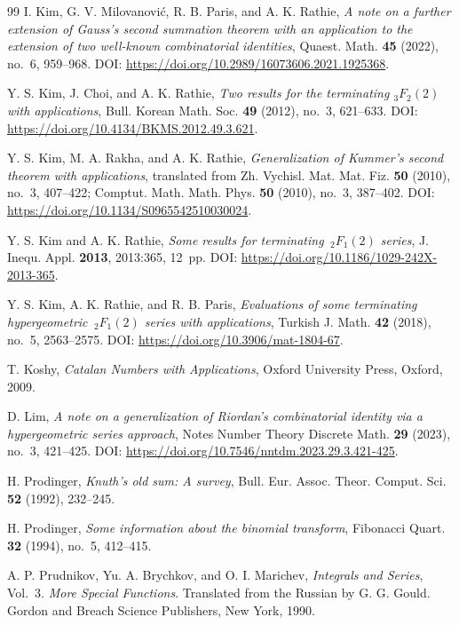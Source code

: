 \documentclass[reqno]{amsart}
\numberwithin{equation}{section}
\theoremstyle{plain}
\theoremstyle{remark}
\begin{document}
\begin{thebibliography}{99}
I. Kim, G. V. Milovanovi\'c, R. B. Paris, and A. K. Rathie, \textit{A note on a further extension of Gauss's second summation theorem with an application to the extension of two well-known combinatorial identities}, Quaest. Math. \textbf{45} (2022), no.~6, 959\nobreakdash--968. DOI: \url{https://doi.org/10.2989/16073606.2021.1925368}.

Y. S. Kim, J. Choi, and A. K. Rathie, \textit{Two results for the terminating $_3F_2(2)$ with applications}, Bull. Korean Math. Soc. \textbf{49} (2012), no.~3, 621\nobreakdash--633. DOI: \url{https://doi.org/10.4134/BKMS.2012.49.3.621}.

Y. S. Kim, M. A. Rakha, and A. K. Rathie, \textit{Generalization of Kummer's second theorem with applications}, translated from Zh. Vychisl. Mat. Mat. Fiz. \textbf{50} (2010), no.~3, 407\nobreakdash--422; Comptut. Math. Math. Phys. \textbf{50} (2010), no.~3, 387\nobreakdash--402. DOI: \url{https://doi.org/10.1134/S0965542510030024}.

Y. S. Kim and A. K. Rathie, \textit{Some results for terminating ${\,}_2F_1(2)$ series}, J. Inequ. Appl. \textbf{2013}, 2013:365, 12~pp. DOI: \url{https://doi.org/10.1186/1029-242X-2013-365}.

Y. S. Kim, A. K. Rathie, and R. B. Paris, \textit{Evaluations of some terminating hypergeometric ${\,}_2F_1(2)$ series with applications}, Turkish J. Math. \textbf{42} (2018), no.~5, 2563\nobreakdash--2575. DOI: \url{https://doi.org/10.3906/mat-1804-67}.

T. Koshy, \emph{Catalan Numbers with Applications}, Oxford University Press, Oxford, 2009.

D. Lim, \textit{A note on a generalization of Riordan's combinatorial identity via a hypergeometric series approach}, Notes Number Theory Discrete Math. \textbf{29} (2023), no.~3, 421\nobreakdash--425. DOI: \url{https://doi.org/10.7546/nntdm.2023.29.3.421-425}.

H. Prodinger, \textit{Knuth's old sum: A survey}, Bull. Eur. Assoc. Theor. Comput. Sci. \textbf{52} (1992), 232\nobreakdash--245.

H. Prodinger, \textit{Some information about the binomial transform}, Fibonacci Quart. \textbf{32} (1994), no.~5, 412\nobreakdash--415.

A. P. Prudnikov, Yu. A. Brychkov, and O. I. Marichev, \emph{Integrals and Series}, Vol.~3. \emph{More Special Functions}. Translated from the Russian by G. G. Gould. Gordon and Breach Science Publishers, New York, 1990.


\end{thebibliography}
\end{document}
